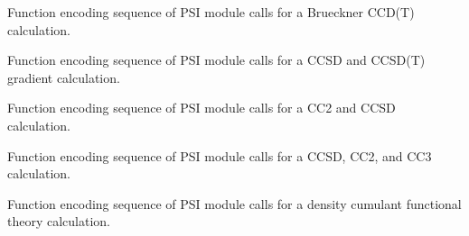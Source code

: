 \documentclass[letterpaper,10pt,english]{sphinxmanual}
\begin{document}

\begin{fulllineitems}
\label{index:proc.run_bccd_t}
Function encoding sequence of PSI module calls for
a Brueckner CCD(T) calculation.

\end{fulllineitems}


\begin{fulllineitems}
\label{index:proc.run_cc_gradient}
Function encoding sequence of PSI module calls for
a CCSD and CCSD(T) gradient calculation.

\end{fulllineitems}


\begin{fulllineitems}
\label{index:proc.run_cc_response}
Function encoding sequence of PSI module calls for
a CC2 and CCSD calculation.

\end{fulllineitems}


\begin{fulllineitems}
\label{index:proc.run_ccenergy}
Function encoding sequence of PSI module calls for
a CCSD, CC2, and CC3 calculation.

\end{fulllineitems}


\begin{fulllineitems}
\label{index:proc.run_dcft}
Function encoding sequence of PSI module calls for
a density cumulant functional theory calculation.

\end{fulllineitems}

\end{document}

